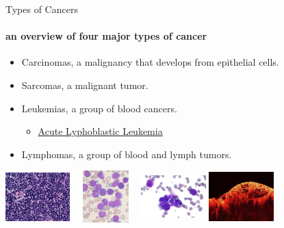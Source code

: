 \documentclass{beamer}
\begin{document}
\begin{frame}{Types of Cancers}
  \framesubtitle{an overview of four major types of cancer}
  \begin{itemize}
    \item Carcinomas, a malignancy that develops from epithelial cells.
    \item Sarcomas, a malignant tumor.
    \item Leukemias, a group of blood cancers.
          \begin{itemize}
            \item \hyperlink{all}{Acute Lyphoblastic Leukemia}
          \end{itemize}
    \item Lymphomas, a group of blood and lymph tumors.
  \end{itemize}
  \vfill
  \hfill \includegraphics[width=25mm,height=20mm]{resources/lymphomas}
  \hfill \includegraphics[width=25mm,height=20mm]{resources/leukemias}
  \hfill \includegraphics[width=25mm,height=20mm]{resources/carincomas}
  \hfill \includegraphics[width=25mm,height=20mm]{resources/sarcomas}
  \hfill

\end{frame}
\end{document}
